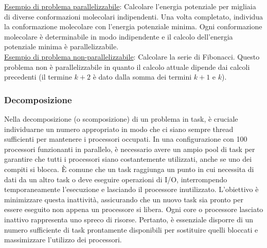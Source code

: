\underline{Esempio di problema parallelizzabile}: Calcolare l'energia potenziale per migliaia di diverse conformazioni molecolari indipendenti. Una volta completato, individua la conformazione molecolare con l'energia potenziale minima. Ogni conformazione molecolare è determinabile in modo indipendente e il calcolo dell'energia potenziale minima è parallelizzabile.
\\

\underline{Esempio di problema non-parallelizzabile}: Calcolare la serie di Fibonacci. Questo problema non è parallelizzabile in quanto il calcolo attuale dipende dai calcoli precedenti (il termine $k+2$ è dato dalla somma dei termini $k+1$ e $k$). 
\\



\subsubsection{Decomposizione}
Nella decomposizione (o scomposizione) di un problema in task, è cruciale individuarne un numero appropriato in modo che ci siano sempre thread sufficienti per mantenere i processori occupati. In una configurazione con 100 processori funzionanti in parallelo, è necessario avere un ampio pool di task per garantire che tutti i processori siano costantemente utilizzati, anche se uno dei compiti si blocca. È comune che un task raggiunga un punto in cui necessita di dati da un altro task o deve eseguire operazioni di I/O, interrompendo temporaneamente l'esecuzione e lasciando il processore inutilizzato. L'obiettivo è minimizzare questa inattività, assicurando che un nuovo task sia pronto per essere eseguito non appena un processore si libera. Ogni core o processore lasciato inattivo rappresenta uno spreco di risorse. Pertanto, è essenziale disporre di un numero sufficiente di task prontamente disponibili per sostituire quelli bloccati e massimizzare l'utilizzo dei processori.

